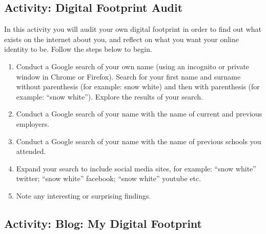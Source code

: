 \documentclass[
]{book}
\providecommand{\tightlist}{%
  \setlength{\itemsep}{0pt}\setlength{\parskip}{0pt}}
\theoremstyle{definition}
\theoremstyle{definition}
\theoremstyle{definition}
\theoremstyle{definition}
\theoremstyle{remark}
\begin{document}
\hypertarget{activity-digital-footprint-audit}{%
\subsection*{Activity: Digital Footprint Audit}\label{activity-digital-footprint-audit}}

\begin{reflect}
In this activity you will audit your own digital footprint in order to find out what exists on the internet about you, and reflect on what you want your online identity to be. Follow the steps below to begin.

\begin{enumerate}
\def\labelenumi{\arabic{enumi}.}
\tightlist
\item
  Conduct a Google search of your own name (using an incognito or private window in Chrome or Firefox). Search for your first name and surname without parenthesis (for example: snow white) and then with parenthesis (for example: ``snow white''). Explore the results of your search.\\
\item
  Conduct a Google search of your name with the name of current and previous employers.\\
\item
  Conduct a Google search of your name with the name of previous schools you attended.\\
\item
  Expand your search to include social media sites, for example: ``snow white'' twitter; ``snow white'' facebook; ``snow white'' youtube etc.\\
\item
  Note any interesting or surprising findings.
\end{enumerate}
\end{reflect}

\hypertarget{activity-blog-my-digital-footprint}{%
\subsection*{Activity: Blog: My Digital Footprint}\label{activity-blog-my-digital-footprint}}
\end{document}
